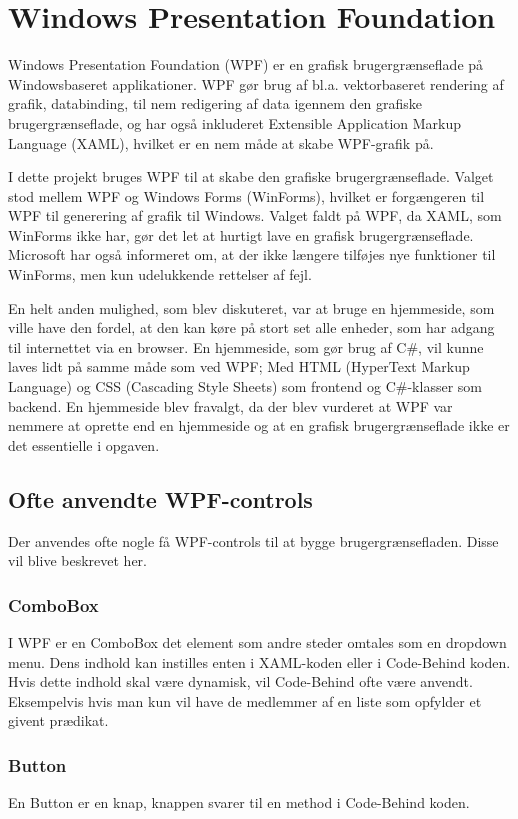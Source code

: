 \section{Windows Presentation Foundation}
Windows Presentation Foundation (WPF) er en grafisk brugergrænseflade på Windowsbaseret applikationer. 
WPF gør brug af  bl.a. vektorbaseret rendering af grafik, databinding, til nem redigering af data igennem den grafiske brugergrænseflade, og har også inkluderet Extensible Application Markup Language (XAML), hvilket er en nem måde at skabe WPF-grafik på.\citep{wpf} 

I dette projekt bruges WPF til at skabe den grafiske brugergrænseflade. Valget stod mellem WPF og Windows Forms (WinForms), hvilket er forgængeren til WPF til generering af grafik til Windows. 
Valget faldt på WPF, da XAML, som WinForms ikke har, gør det let at hurtigt lave en grafisk brugergrænseflade. 
Microsoft har også informeret om, at der ikke længere tilføjes nye funktioner til WinForms, men kun udelukkende rettelser af fejl.\citep{winforms}

En helt anden mulighed, som blev diskuteret, var at bruge en hjemmeside, som ville have den fordel, at den kan køre på stort set alle enheder, som har adgang til internettet via en browser. En hjemmeside, som gør brug af C\#, vil kunne laves lidt på samme måde som ved WPF; Med HTML (HyperText Markup Language) og CSS (Cascading Style Sheets) som frontend og C\#-klasser som backend. 
En hjemmeside blev fravalgt, da der blev vurderet at WPF var nemmere at oprette end en hjemmeside og at en grafisk brugergrænseflade ikke er det essentielle i opgaven. 

\subsection{Ofte anvendte WPF-controls}
Der anvendes ofte nogle få WPF-controls til at bygge brugergrænsefladen.
Disse vil blive beskrevet her.

\subsubsection{ComboBox}
I WPF er en ComboBox det element som andre steder omtales som en dropdown menu. 
Dens indhold kan instilles enten i XAML-koden eller i Code-Behind koden.
Hvis dette indhold skal være dynamisk, vil Code-Behind ofte være anvendt.
Eksempelvis hvis man kun vil have de medlemmer af en liste som opfylder et givent prædikat. 

\subsubsection{Button}
En Button er en knap, knappen svarer til en method i Code-Behind koden. 


